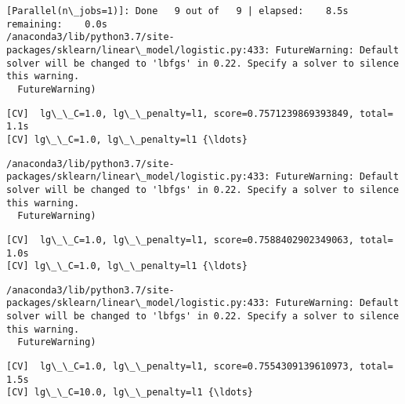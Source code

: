 \documentclass[11pt]{article}
\begin{document}
    \begin{Verbatim}[commandchars=\\\{\}]
[Parallel(n\_jobs=1)]: Done   9 out of   9 | elapsed:    8.5s remaining:    0.0s
/anaconda3/lib/python3.7/site-packages/sklearn/linear\_model/logistic.py:433: FutureWarning: Default solver will be changed to 'lbfgs' in 0.22. Specify a solver to silence this warning.
  FutureWarning)

    \end{Verbatim}

    \begin{Verbatim}[commandchars=\\\{\}]
[CV]  lg\_\_C=1.0, lg\_\_penalty=l1, score=0.7571239869393849, total=   1.1s
[CV] lg\_\_C=1.0, lg\_\_penalty=l1 {\ldots}

    \end{Verbatim}

    \begin{Verbatim}[commandchars=\\\{\}]
/anaconda3/lib/python3.7/site-packages/sklearn/linear\_model/logistic.py:433: FutureWarning: Default solver will be changed to 'lbfgs' in 0.22. Specify a solver to silence this warning.
  FutureWarning)

    \end{Verbatim}

    \begin{Verbatim}[commandchars=\\\{\}]
[CV]  lg\_\_C=1.0, lg\_\_penalty=l1, score=0.7588402902349063, total=   1.0s
[CV] lg\_\_C=1.0, lg\_\_penalty=l1 {\ldots}

    \end{Verbatim}

    \begin{Verbatim}[commandchars=\\\{\}]
/anaconda3/lib/python3.7/site-packages/sklearn/linear\_model/logistic.py:433: FutureWarning: Default solver will be changed to 'lbfgs' in 0.22. Specify a solver to silence this warning.
  FutureWarning)

    \end{Verbatim}

    \begin{Verbatim}[commandchars=\\\{\}]
[CV]  lg\_\_C=1.0, lg\_\_penalty=l1, score=0.7554309139610973, total=   1.5s
[CV] lg\_\_C=10.0, lg\_\_penalty=l1 {\ldots}

    \end{Verbatim}
\end{document}
